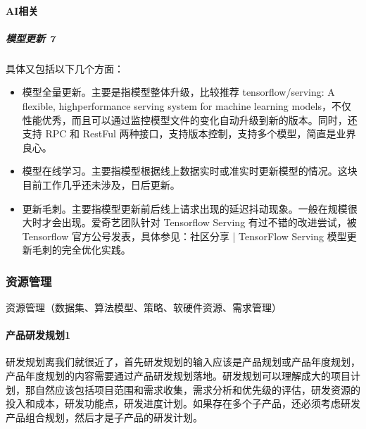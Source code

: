\documentclass[letterpaper,10pt,english]{sphinxmanual}
\begin{document}
\paragraph{AI相关}
\label{\detokenize{chapter_knowledge/upgrade_manage:ai}}

\subparagraph{模型更新 7\sphinxfootnotemark[680]}
\label{\detokenize{chapter_knowledge/upgrade_manage:id21}}%
\begin{footnotetext}[680]\sphinxAtStartFootnote
{}
%
\end{footnotetext}\ignorespaces 
具体又包括以下几个方面：
\begin{itemize}
\item {} 
模型全量更新。主要是指模型整体升级，比较推荐 tensorflow/serving: A
flexible, high\sphinxhyphen{}performance serving system for machine learning
models，不仅性能优秀，而且可以通过监控模型文件的变化自动升级到新的版本。同时，还支持
RPC 和 RestFul 两种接口，支持版本控制，支持多个模型，简直是业界良心。

\item {} 
模型在线学习。主要指模型根据线上数据实时或准实时更新模型的情况。这块目前工作几乎还未涉及，日后更新。

\item {} 
更新毛刺。主要指模型更新前后线上请求出现的延迟抖动现象。一般在规模很大时才会出现。爱奇艺团队针对
Tensorflow Serving 有过不错的改进尝试，被 Tensorflow
官方公号发表，具体参见：社区分享 | TensorFlow Serving
模型更新毛刺的完全优化实践。

\end{itemize}


\subsubsection{资源管理}
\label{\detokenize{chapter_knowledge/resource_manage:id1}}\label{\detokenize{chapter_knowledge/resource_manage::doc}}
资源管理（数据集、算法模型、策略、软硬件资源、需求管理）


\paragraph{产品研发规划1\sphinxfootnotemark[681]}
\label{\detokenize{chapter_knowledge/resource_manage:id2}}%
\begin{footnotetext}[681]\sphinxAtStartFootnote
{}
%
\end{footnotetext}\ignorespaces 
研发规划离我们就很近了，首先研发规划的输入应该是产品规划或产品年度规划，产品年度规划的内容需要通过产品研发规划落地。研发规划可以理解成大的项目计划，那自然应该包括项目范围和需求收集，需求分析和优先级的评估，研发资源的投入和成本，研发功能点，研发进度计划。如果存在多个子产品，还必须考虑研发产品组合规划，然后才是子产品的研发计划。
\end{document}
